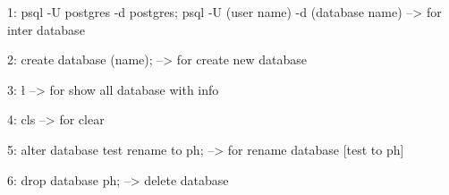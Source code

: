 1: psql -U postgres -d postgres;
   psql -U (user name) -d (database name)
--> for inter database

2: create database (name);
--> for create new database

3: \l
--> for show all database with info

4: \! cls
--> for clear

5: alter database test rename to ph;
--> for rename database [test to ph]

6: drop database ph;
--> delete database

